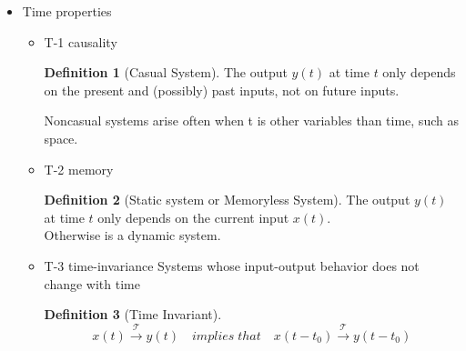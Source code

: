 \documentclass{article}
\theoremstyle{definition}
\newtheorem{definition}{Definition}[subsection]
\begin{document}
\begin{itemize}
\begin{itemize}
\begin{equation}
                \end{equation}
        \end{itemize}
    \item Time properties
        \begin{itemize}
            \item T-1 causality
                \begin{definition}[Casual System]
                    The output $ y(t) $ at time $ t $ only depends on the present and (possibly) past inputs, not on future inputs.
                \end{definition}
                Noncasual systems arise often when t is other variables than time, such as space.
            \item T-2 memory
                \begin{definition}[Static system or Memoryless System]
                    The output $ y(t) $ at time $ t $ only depends on the current input $ x(t) $.\\
                    Otherwise is a dynamic system.
                \end{definition}                
            \item T-3 time-invariance
                Systems whose input-output behavior does not change with time
                \begin{definition}[Time Invariant]
                    \begin{equation}
                        x(t)\mathop{\rightarrow}\limits^{\mathcal{T}}y(t) \quad implies\; that \quad x(t-t_0)\mathop{\rightarrow}\limits^{\mathcal{T}}y(t-t_0)
                    \end{equation}
                \end{definition}
        \end{itemize}
\end{itemize}
\end{document}
